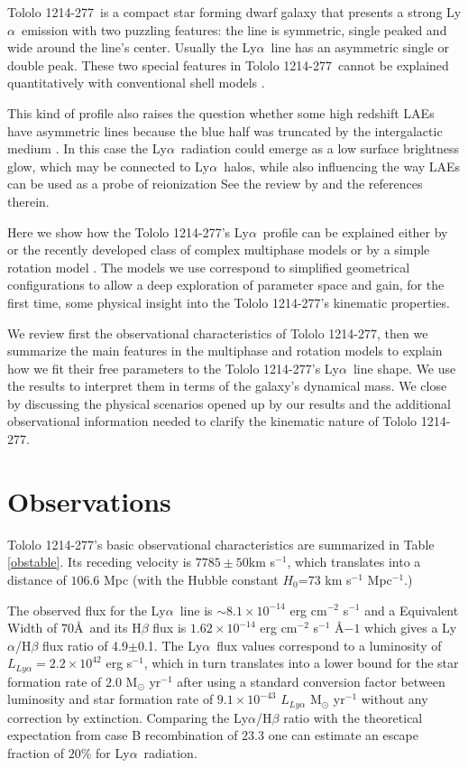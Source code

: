 \documentclass[a4,useAMS,usenatbib,usegraphicx]{mn2e}
\newcommand{\tol}{Tololo 1214-277}
\newcommand{\lya}{Ly$\alpha$}
\begin{document}
\tol\ is a compact star forming dwarf galaxy that presents a
strong \lya\ emission \citep{Thuan97} with two puzzling 
features: the line is symmetric, single peaked and wide around the
line's center.
Usually the \lya\ line has an asymmetric single or double peak. 
These two special features in \tol\ cannot be explained quantitatively
with conventional shell models
\citep{mashesse03,2012ApJ...751...29Y,2015A&A...578A...7V,2015ApJ...812..123G}.   

This kind of profile also raises the question whether some high redshift
LAEs have asymmetric lines because the blue half was truncated by the
intergalactic medium \citep{2007MNRAS.377.1175D}. 
In this case the \lya\ radiation could emerge as a low surface
brightness glow, which may be connected to \lya\ halos, while also
influencing the way LAEs can be used as a probe of reionization
See the review by \cite{2014PASA...31...40D} and the references therein.

Here we show how the \tol's \lya\ profile can be explained
either by  or the recently developed class of complex multiphase models 
\citep{Gronke2016} or by a simple rotation model
\citep{GaravitoCamargo2014}. 
The models we use correspond to simplified geometrical configurations
to allow a deep exploration of parameter space and gain, for the first time,
some physical insight into the \tol's kinematic properties.

We review first the observational characteristics of
\tol, then we summarize the main features in the multiphase and
rotation models to explain how we fit their free parameters 
to the \tol's \lya\ line shape.
We use the results to interpret them in terms of the galaxy's
dynamical mass. 
We close by discussing the physical scenarios opened up by our
results and the additional observational information needed to clarify
the kinematic nature of \tol.


\section{Observations}
\tol's basic observational characteristics are summarized in Table \ref{obstable}.
Its receding velocity is $7785\pm 50$km s$^{-1}$, which translates
into a distance of $106.6$ Mpc (with the Hubble constant $H_{0}$=73
km s$^{-1}$ Mpc$^{-1}$.) 

The observed flux for the \lya\ line is $\sim
8.1\times 10^{-14}$ erg cm$^{-2}$ s$^{-1}$ \citep{Thuan97}
and a Equivalent Width of $70$\AA\ and its H$\beta$ flux is 
$1.62\times 10^{-14}$ erg cm$^{-2}$ s$^{-1}$ \AA${-1}$
\citep{Izotov04} which gives a \lya/H$\beta$ flux ratio of
4.9$\pm$0.1.
The \lya\ flux values correspond to a luminosity of
$L_{Ly\alpha}=2.2\times 10^{42}$ erg s$^{-1}$, which in turn
translates  into a lower bound for the star formation rate of $2.0$
M$_{\odot}$ yr$^{-1}$ after using a standard conversion factor between
luminosity and star formation rate of $9.1\times 10^{-43}$
$L_{Ly\alpha}$ M$_{\odot}$ yr$^{-1}$ \citep{Kennicutt98} without any
correction by extinction.  
Comparing the \lya/H$\beta$ ratio with the theoretical
expectation from case B recombination of $23.3$ \citep{Hummer1987} one
can estimate an escape fraction of $20$\% for \lya\ radiation.
\end{document}
